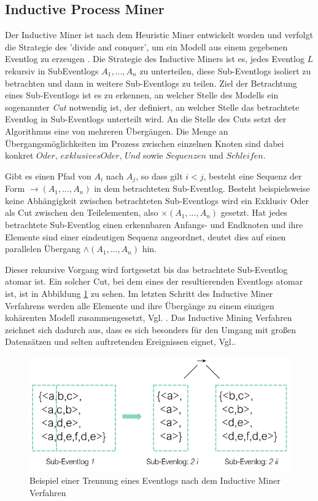 \subsection{Inductive Process Miner}\label{sec:inducMiner}
Der Inductive Miner ist nach dem Heuristic Miner entwickelt worden und verfolgt die Strategie des 'divide and conquer', um ein Modell aus einem gegebenen Eventlog zu erzeugen \cite{inducMining}. 
Die Strategie des Inductive Miners ist es, jedes Eventlog $L$ rekursiv in SubEventlogs $A_1 , ... , A_n$ zu unterteilen, diese Sub-Eventlogs isoliert zu betrachten und dann in weitere Sub-Eventlogs zu teilen. 
Ziel der Betrachtung eines Sub-Eventlogs ist es zu erkennen, an welcher Stelle des Modells ein sogenannter \textit{Cut} notwendig ist, der definiert, an welcher Stelle das betrachtete Eventlog in Sub-Eventlogs unterteilt wird. An die Stelle des Cuts setzt der Algorithmus eine von mehreren Übergängen. Die Menge an Übergangsmöglichkeiten im Prozess zwischen einzelnen Knoten sind dabei konkret $Oder$, $exklusives  Oder$, $Und$ sowie $Sequenzen$ und $Schleifen$. 

\newpage
Gibt es einen Pfad von $A_i$ nach $A_j$, so dass gilt $ i < j $, besteht eine Sequenz der Form $ → (A_1 , ... , A_n)$ in dem betrachteten Sub-Eventlog.
Besteht beispielsweise keine Abhängigkeit zwischen betrachteten Sub-Eventlogs wird ein Exklusiv Oder als Cut zwischen den Teilelementen, also $ × (A_1 , ... , A_n)$ gesetzt. 
Hat jedes betrachtete Sub-Eventlog einen erkennbaren Anfangs- und Endknoten und ihre Elemente sind einer eindeutigen Sequenz angeordnet, deutet dies auf einen parallelen Übergang $ ∧ (A_1 , ... , A_n)$ hin. 

Dieser rekursive Vorgang wird fortgesetzt bis das betrachtete Sub-Eventlog atomar ist. Ein solcher Cut, bei dem eines der resultierenden Eventlogs atomar ist, ist in Abbildung \ref{fig:imExample} zu sehen. Im letzten Schritt des Inductive Miner Verfahrens werden alle Elemente und ihre Übergänge zu einem einzigen kohärenten Modell zusammengesetzt, Vgl. \cite{inducMining}. Das Inductive Mining Verfahren zeichnet sich dadurch aus, dass es sich besonders für den Umgang mit großen Datensätzen und selten auftretenden Ereignissen eignet, Vgl.\cite{minerEval}.

\begin{figure}[!h]
    \centering
    \includegraphics[scale=0.5]{figures/Appbildungen/im_example.PNG}
    \caption{Beispiel einer Trennung eines Eventlogs nach dem Inductive Miner Verfahren}
    \label{fig:imExample}
\end{figure}

